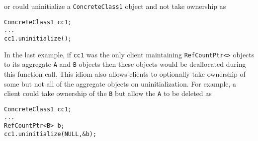 {}\noindent{}or could uninitialize a {}\texttt{Concrete\-Class1}
object and not take ownership as

{\scriptsize\begin{verbatim}
ConcreteClass1 cc1;
...
cc1.uninitialize();
\end{verbatim}}

{}\noindent{}In the last example, if {}\texttt{cc1} was the only
client maintaining {}\texttt{RefCountPtr<>} objects to its aggregate
{}\texttt{A} and {}\texttt{B} objects then these objects would be
deallocated during this function call.  This idiom also allows clients
to optionally take ownership of some but not all of the aggregate
objects on uninitialization.  For example, a client could take
ownership of the {}\texttt{B} but allow the {}\texttt{A} to be deleted
as
%
{\scriptsize\begin{verbatim}
ConcreteClass1 cc1;
...
RefCountPtr<B> b;
cc1.uninitialize(NULL,&b);
\end{verbatim}}
%
